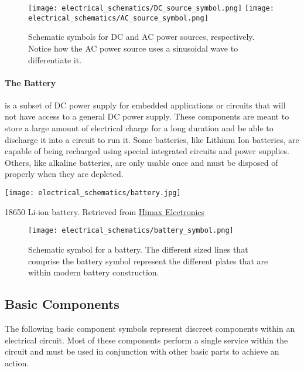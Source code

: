         \begin{figure}[h!]
            \texttt{[image: electrical\_schematics/DC\_source\_symbol.png]}
            \texttt{[image: electrical\_schematics/AC\_source\_symbol.png]}
            \caption[Source Symbols]{Schematic symbols for DC and AC power sources, respectively. 
            Notice how the AC power source uses a sinusoidal wave to differentiate it.}
        \end{figure}

        \paragraph*{The Battery} is a subset of DC power supply for embedded applications or circuits that will not have access to a general DC power supply.
        These components are meant to store a large amount of electrical charge for a long duration and be able to discharge it into a circuit to run it.
        Some batteries, like Lithium Ion batteries, are capable of being recharged using special integrated circuits and power supplies.
        Others, like alkaline batteries, are only usable once and must be disposed of properly when they are depleted.

    \begin{marginfigure}[-2in]
        \texttt{[image: electrical\_schematics/battery.jpg]}
        \caption[Chip Resistors]{18650 Li-ion battery. 
        Retrieved from \href{https://himaxelectronics.com/product-item/18650-3000mah-li-ion-battery-cell/}{Himax Electronics}}
    \end{marginfigure}

    \begin{figure}[h!]
        \texttt{[image: electrical\_schematics/battery\_symbol.png]}
        \caption[Resistor Symbols]{Schematic symbol for a battery. 
        The different sized lines that comprise the battery symbol represent the different plates that are within modern battery construction.}
    \end{figure}

    \subsection{Basic Components} 
    The following basic component symbols represent discreet components within an electrical circuit.
    Most of these components perform a single service within the circuit and must be used in conjunction with other basic parts to achieve an action.

